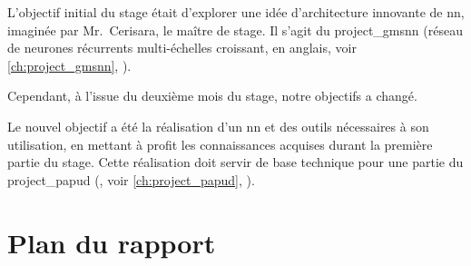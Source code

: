 L'objectif initial du stage était d'explorer une idée d'architecture innovante de \gls{nn}, imaginée par Mr.~Cerisara, le maître de stage. Il s'agit du \gls{project_gmsnn} (réseau de neurones récurrents multi-échelles croissant,  en anglais, voir \autoref{ch:project_gmsnn}, ).

Cependant, à l'issue du deuxième mois du stage, notre objectifs a changé.

Le nouvel objectif a été la réalisation d'un \gls{nn} et des outils nécessaires à son utilisation, en mettant à profit les connaissances acquises durant la première partie du stage.
Cette réalisation doit servir de base technique pour une partie du \gls{project_papud} (, voir \autoref{ch:project_papud}, ).




\section[Plan]{Plan du rapport}

